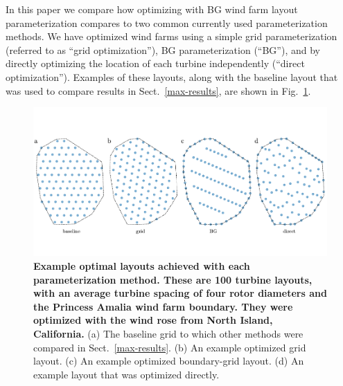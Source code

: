 \documentclass[wes, manuscript]{copernicus}
\begin{document}
In this paper we compare how optimizing with BG wind farm layout parameterization compares to two common currently used parameterization methods. We have optimized wind farms using a simple grid parameterization (referred to as ``grid optimization''), BG parameterization (``BG''),  and by directly optimizing the location of each turbine independently (``direct optimization''). Examples of these layouts, along with the baseline layout that was used to compare results in Sect.~\ref{max-results}, are shown in Fig.~\ref{opt-cases}.
%
\begin{figure}
\centering
\includegraphics{paper-figures/opt-cases}
\caption{\textbf{Example optimal layouts achieved with each parameterization method. These are 100 turbine layouts, with an average turbine spacing of four rotor diameters and the Princess Amalia wind farm boundary. They were optimized with the wind rose from North Island, California.} (a) The baseline grid to which other methods were compared in Sect.~\ref{max-results}. (b) An example optimized grid layout. (c) An example optimized boundary-grid layout. (d) An example layout that was optimized directly.}
\label{opt-cases}
\end{figure}
\end{document}
